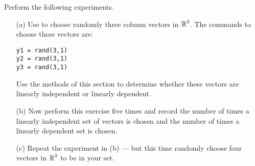 \documentclass{ximera}
\begin{document}
\begin{exercise} \label{c5.4.9}
Perform the following experiments.
\begin{itemize}
\item[(a)]   Use \Matlab to choose randomly three column vectors in
$\mbox{$\Bbb{R}$}^3$.  The \Matlab commands to choose these vectors are:
\begin{verbatim}
y1 = rand(3,1)
y2 = rand(3,1)
y3 = rand(3,1)
\end{verbatim}
Use the methods of this section to determine whether these vectors
are linearly independent or linearly dependent.
\item[(b)]  Now perform this exercise five times and record the number
of times a linearly independent set of vectors is chosen and the
number of times a linearly dependent set is chosen.
\item[(c)]  Repeat the experiment in (b) --- but this time randomly
choose four vectors in $\mbox{$\Bbb{R}$}^3$ to be in your set.
\end{itemize}
\end{exercise}
\end{document}
